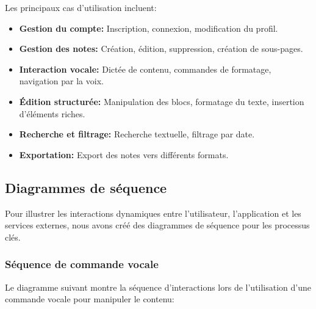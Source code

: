 Les principaux cas d'utilisation incluent:

\begin{itemize}
    \item \textbf{Gestion du compte:} Inscription, connexion, modification du profil.
    
    \item \textbf{Gestion des notes:} Création, édition, suppression, création de sous-pages.
    
    \item \textbf{Interaction vocale:} Dictée de contenu, commandes de formatage, navigation par la voix.
    
    \item \textbf{Édition structurée:} Manipulation des blocs, formatage du texte, insertion d'éléments riches.
    
    \item \textbf{Recherche et filtrage:} Recherche textuelle, filtrage par date.
    
    \item \textbf{Exportation:} Export des notes vers différents formats.
\end{itemize}

\subsection{Diagrammes de séquence}

Pour illustrer les interactions dynamiques entre l'utilisateur, l'application et les services externes, nous avons créé des diagrammes de séquence pour les processus clés.

\subsubsection{Séquence de commande vocale}

Le diagramme suivant montre la séquence d'interactions lors de l'utilisation d'une commande vocale pour manipuler le contenu:

